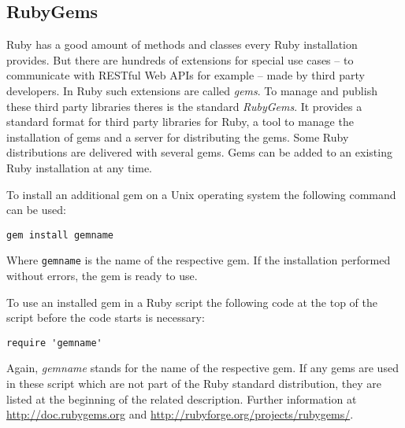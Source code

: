 \subsection{RubyGems}
Ruby has a good amount of methods and classes every Ruby installation provides. But there are hundreds of extensions for special use cases – to communicate with RESTful Web APIs for example – made by third party developers. In Ruby such extensions are called \emph{gems}. To manage and publish these third party libraries theres is the standard \emph{RubyGems}. It provides a standard format for third party libraries for Ruby, a tool to manage the installation of gems and a server for distributing the gems. \cite{ruby:gemdev} Some Ruby distributions are delivered with several gems. Gems can be added to an existing Ruby installation at any time. 

To install an additional gem on a Unix operating system the following command can be used:  
\begin{center}
\texttt{gem install gemname}
\end{center}
Where \texttt{gemname} is the name of the respective gem. If the installation performed without errors, the gem is ready to use. \cite{ruby:gemdoc}

To use an installed gem in a Ruby script the following code at the top of the script before the code starts is necessary:

\begin{lstlisting}[float=htb, caption=Using the gem \emph{gemname}, label=listing001]
require 'gemname'
\end{lstlisting}
Again, \emph{gemname} stands for the name of the respective gem. If any gems are used in these script which are not part of the Ruby standard distribution, they are listed at the beginning of the related description. Further information at \url{http://doc.rubygems.org} and \url{http://rubyforge.org/projects/rubygems/}.

